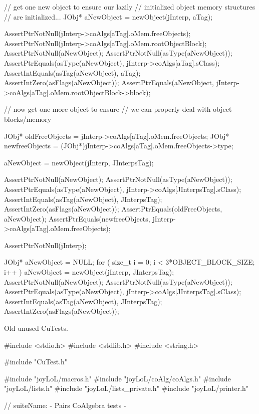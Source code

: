   // get one new object to ensure our lazily
  // initialized object memory structures 
  // are initialized...
  JObj* aNewObject = newObject(jInterp, aTag);
  
  AssertPtrNotNull(jInterp->coAlgs[aTag].oMem.freeObjects);
  AssertPtrNotNull(jInterp->coAlgs[aTag].oMem.rootObjectBlock);
  AssertPtrNotNull(aNewObject);
  AssertPtrNotNull(asType(aNewObject));
  AssertPtrEquals(asType(aNewObject), jInterp->coAlgs[aTag].sClass);
  AssertIntEquals(asTag(aNewObject), aTag);
  AssertIntZero(asFlags(aNewObject));
  AssertPtrEquals(aNewObject,
    jInterp->coAlgs[aTag].oMem.rootObjectBlock->block);

  // now get one more object to ensure
  // we can properly deal with object blocks/memory
  
  JObj* oldFreeObjects =
    jInterp->coAlgs[aTag].oMem.freeObjects;
  JObj* newfreeObjects = 
    (JObj*)jInterp->coAlgs[aTag].oMem.freeObjects->type;

  aNewObject = newObject(jInterp, JInterpsTag);

  AssertPtrNotNull(aNewObject);
  AssertPtrNotNull(asType(aNewObject));
  AssertPtrEquals(asType(aNewObject), jInterp->coAlgs[JInterpsTag].sClass);
  AssertIntEquals(asTag(aNewObject), JInterpsTag);
  AssertIntZero(asFlags(aNewObject));
  AssertPtrEquals(oldFreeObjects, aNewObject);
  AssertPtrEquals(newfreeObjects, jInterp->coAlgs[aTag].oMem.freeObjects);
\stopCTest
\stopTestCase


\startCTest
  AssertPtrNotNull(jInterp);

  JObj* aNewObject = NULL;
  for ( size_t i = 0; i < 3*OBJECT_BLOCK_SIZE; i++ ) {
    aNewObject = newObject(jInterp, JInterpsTag);
  }
  AssertPtrNotNull(aNewObject);
  AssertPtrNotNull(asType(aNewObject));
  AssertPtrEquals(asType(aNewObject), jInterp->coAlgs[JInterpsTag].sClass);
  AssertIntEquals(asTag(aNewObject), JInterpsTag);
  AssertIntZero(asFlags(aNewObject));
\stopCTest
\stopTestCase
\stopTestSuite

Old unused CuTests.

\starttyping
#include <stdio.h>
#include <stdlib.h>
#include <string.h>

#include "CuTest.h"

#include "joyLoL/macros.h"
#include "joyLoL/coAlg/coAlgs.h"
#include "joyLoL/lists.h"
#include "joyLoL/lists_private.h"
#include "joyLoL/printer.h"

// suiteName: - Pairs CoAlgebra tests -

